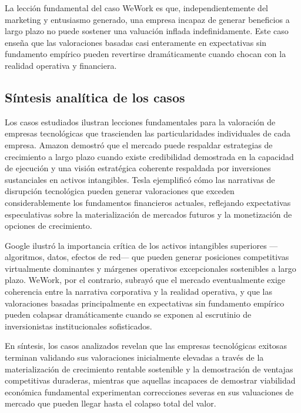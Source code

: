 La lección fundamental del caso WeWork es que, independientemente del marketing y entusiasmo generado, una empresa incapaz de generar beneficios a largo plazo no puede sostener una valuación inflada indefinidamente. Este caso enseña que las valoraciones basadas casi enteramente en expectativas sin fundamento empírico pueden revertirse dramáticamente cuando chocan con la realidad operativa y financiera.

\subsection{Síntesis analítica de los casos}

Los casos estudiados ilustran lecciones fundamentales para la valoración de empresas tecnológicas que trascienden las particularidades individuales de cada empresa. Amazon demostró que el mercado puede respaldar estrategias de crecimiento a largo plazo cuando existe credibilidad demostrada en la capacidad de ejecución y una visión estratégica coherente respaldada por inversiones sustanciales en activos intangibles. Tesla ejemplificó cómo las narrativas de disrupción tecnológica pueden generar valoraciones que exceden considerablemente los fundamentos financieros actuales, reflejando expectativas especulativas sobre la materialización de mercados futuros y la monetización de opciones de crecimiento.

Google ilustró la importancia crítica de los activos intangibles superiores ---algoritmos, datos, efectos de red--- que pueden generar posiciones competitivas virtualmente dominantes y márgenes operativos excepcionales sostenibles a largo plazo. WeWork, por el contrario, subrayó que el mercado eventualmente exige coherencia entre la narrativa corporativa y la realidad operativa, y que las valoraciones basadas principalmente en expectativas sin fundamento empírico pueden colapsar dramáticamente cuando se exponen al escrutinio de inversionistas institucionales sofisticados.

En síntesis, los casos analizados revelan que las empresas tecnológicas exitosas terminan validando sus valoraciones inicialmente elevadas a través de la materialización de crecimiento rentable sostenible y la demostración de ventajas competitivas duraderas, mientras que aquellas incapaces de demostrar viabilidad económica fundamental experimentan correcciones severas en sus valuaciones de mercado que pueden llegar hasta el colapso total del valor. 
